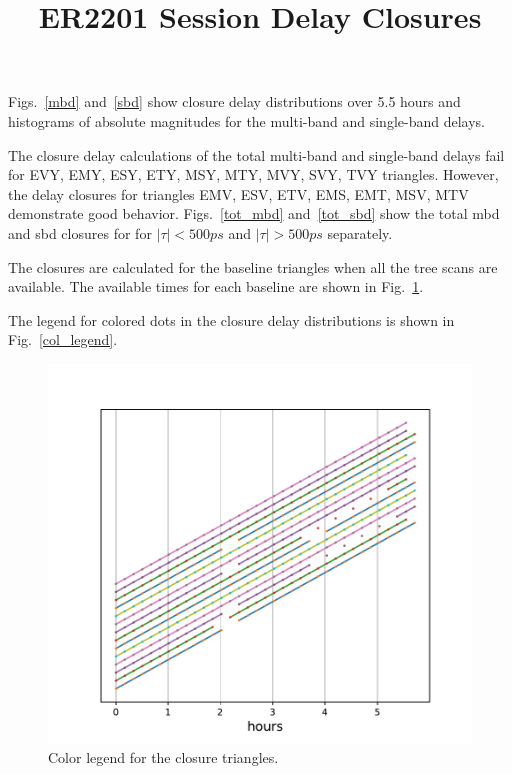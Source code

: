 \documentclass[letterpaper,twoside,12pt]{article}
\title{ER2201 Session Delay Closures}
\begin{document}
\maketitle

Figs.~\ref{mbd} and~\ref{sbd} show closure delay distributions over 5.5 hours and histograms of absolute magnitudes for the multi-band and single-band delays.

The closure delay calculations of the total multi-band and single-band delays fail for EVY, EMY, ESY, ETY, MSY, MTY, MVY, SVY, TVY triangles. However, the delay closures for triangles EMV, ESV, ETV, EMS, EMT, MSV, MTV demonstrate good behavior. Figs.~\ref{tot_mbd} and~\ref{tot_sbd} show the total mbd and sbd closures for for $|\tau| < 500 ps$ and $|\tau| > 500 ps$ separately. 

The closures are calculated for the baseline triangles when all the tree scans are available. The available times for each baseline are shown in Fig.~\ref{time_gaps}.

The legend for colored dots in the closure delay distributions is shown in Fig.~\ref{col_legend}.


\begin{figure}[h!]
  \centering
  \includegraphics[width=30pc]{Gaps_in_Time.pdf}
  \caption{\small Color legend for the closure triangles.}
  \label{time_gaps}
\end{figure}
\end{document}

